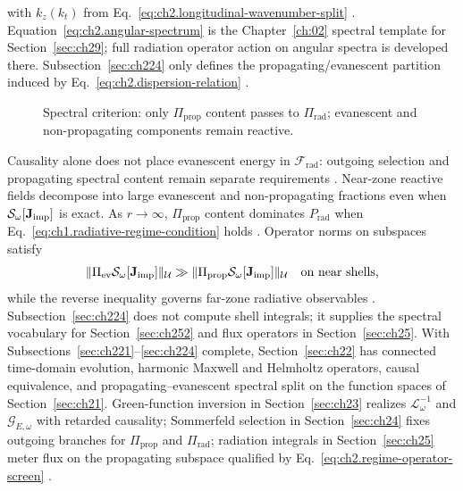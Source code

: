 with \(k_z(k_t)\) from Eq.~\eqref{eq:ch2.longitudinal-wavenumber-split}
\cite{stratton1941}. Equation~\eqref{eq:ch2.angular-spectrum} is the
Chapter~\ref{ch:02} spectral template for Section~\ref{sec:ch29}; full radiation
operator action on angular spectra is developed there. Subsection~\ref{sec:ch224} only
defines the propagating/evanescent partition induced by
Eq.~\eqref{eq:ch2.dispersion-relation} \cite{harrington2001}.
\begin{figure}[t]
\centering
{}
\caption{Spectral criterion: only \(\Pi_{\mathrm{prop}}\) content passes to
\(\Pi_{\mathrm{rad}}\); evanescent and non-propagating components remain reactive.}
\label{fig:ch2.spectral-radiation-criterion}
\end{figure}
Causality alone does not place evanescent energy in \(\mathcal{F}_{\mathrm{rad}}\): outgoing
selection and propagating spectral content remain separate requirements
\cite{stratton1941}. Near-zone reactive fields decompose into large evanescent and non-propagating
fractions even when \(\mathcal{S}_\omega[\mathbf{J}_{\mathrm{imp}}]\) is exact. As \(r\to\infty\),
\(\Pi_{\mathrm{prop}}\) content dominates \(P_{\mathrm{rad}}\) when
Eq.~\eqref{eq:ch1.radiative-regime-condition} holds \cite{stratton1941}. Operator
norms on subspaces satisfy
\begin{equation}
\label{eq:ch2.subspace-energy-inequality}
\|\Pi_{\mathrm{ev}}\mathcal{S}_\omega[\mathbf{J}_{\mathrm{imp}}]\|_{\mathcal{U}}
\gg
\|\Pi_{\mathrm{prop}}\mathcal{S}_\omega[\mathbf{J}_{\mathrm{imp}}]\|_{\mathcal{U}}
\quad\text{on near shells,}
\end{equation}
while the reverse inequality governs far-zone radiative observables
\cite{harrington2001}. Subsection~\ref{sec:ch224} does not compute
shell integrals; it supplies the spectral vocabulary for
Section~\ref{sec:ch252} and flux operators in Section~\ref{sec:ch25}.
With Subsections~\ref{sec:ch221}--\ref{sec:ch224} complete, Section~\ref{sec:ch22}
has connected time-domain evolution, harmonic Maxwell and Helmholtz operators,
causal equivalence, and propagating--evanescent spectral split on the function spaces
of Section~\ref{sec:ch21}. Green-function inversion in Section~\ref{sec:ch23}
realizes \(\mathcal{L}_\omega^{-1}\) and \(\mathcal{G}_{E,\omega}\) with retarded
causality; Sommerfeld selection in Section~\ref{sec:ch24} fixes outgoing branches for
\(\Pi_{\mathrm{prop}}\) and \(\Pi_{\mathrm{rad}}\); radiation integrals in
Section~\ref{sec:ch25} meter flux on the propagating subspace qualified by
Eq.~\eqref{eq:ch2.regime-operator-screen} \cite{stratton1941}.
